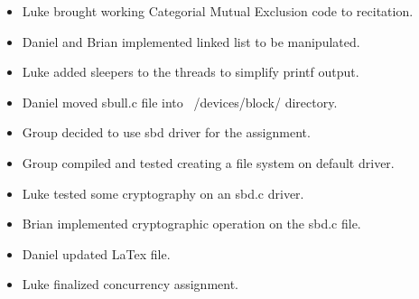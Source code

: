 \documentclass[10pt,letterpaper,draftclsnofoot,onecolumn]{IEEEtran}
\begin{document}
\begin{itemize}
\item Luke brought working Categorial Mutual Exclusion code to recitation.
\item Daniel and Brian implemented linked list to be manipulated.
\item Luke added sleepers to the threads to simplify printf output. 
\item Daniel moved sbull.c file into ~/devices/block/ directory.
\item Group decided to use sbd driver for the assignment.
\item Group compiled and tested creating a file system on default driver.
\item Luke tested some cryptography on an sbd.c driver.
\item Brian implemented cryptographic operation on the sbd.c file.
\item Daniel updated LaTex file. 
\item Luke finalized concurrency assignment.

\end{itemize}
\end{document}
